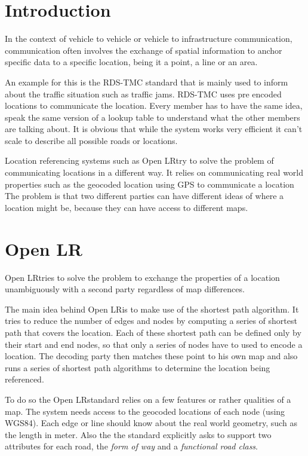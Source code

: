 \section{Introduction}
\label{sec:introduction}

In the context of vehicle to vehicle or vehicle to infrastructure communication, communication often involves the exchange of spatial information to anchor specific data to a specific location, being it a point, a line or an area.

An example for this is the RDS-TMC standard that is mainly used to inform about the  traffic situation such as traffic jams. RDS-TMC uses pre encoded locations to communicate the location. Every member has to have the same idea, speak the same version of a lookup table to understand what the other members are talking about. It is obvious that while the system works very efficient it can't scale to describe all possible roads or locations. 

Location referencing systems such as Open LR\tm try to solve the problem of communicating locations in a different way. It relies on communicating real world properties such as the geocoded location using GPS to communicate a location The problem is that two different parties can have different ideas of where a location might be, because they can have access to different maps. 

\section{Open LR\tm}
\label{sec:open_lr}

Open LR\tm tries to solve the problem to exchange the properties of a location unambiguously with a second party regardless of map differences. 

The main idea behind Open LR\tm is to make use of the shortest path algorithm. It tries to reduce the number of edges and nodes by computing a series of shortest path that covers the location. Each of these shortest path can be defined only by their start and end nodes, so that only a series of nodes have to used to encode a location. The decoding party then matches these point to his own map and also runs a series of shortest path algorithms to determine the location being referenced.

To do so the Open LR\tm standard relies on a few features or rather qualities of a map. The system needs access to the geocoded locations of each node (using WGS84). Each edge or line should know about the real world geometry, such as the length in meter. Also the the standard explicitly asks to support two attributes for each road, the \emph{form of way }and a \emph{functional road class}.

